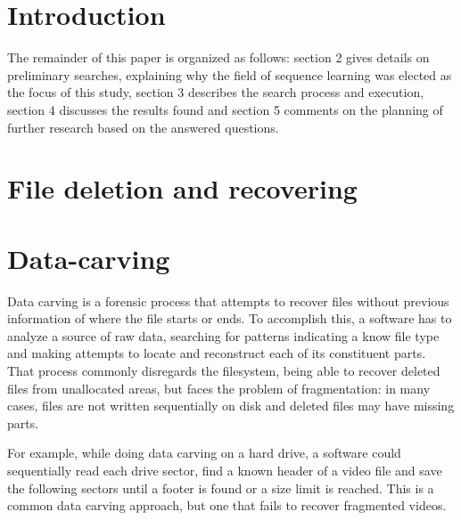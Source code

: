 \chapter{Introduction}
The remainder of this paper is organized as follows:
section 2 gives details on preliminary searches, explaining why the field of sequence learning was elected as the focus of this study, section 3 describes the search process and execution, section 4 discusses the results found and section 5 comments on the planning of further research based on the answered questions.


\chapter{File deletion and recovering}

\chapter{Data-carving}
Data carving is a forensic process that attempts to recover files without previous information of where the file starts or ends.
To accomplish this, a software has to analyze a source of raw data, searching for patterns indicating a know file type and making attempts to locate and reconstruct each of its constituent parts.
That process commonly disregards the filesystem, being able to recover deleted files from unallocated areas, but faces the problem of fragmentation: in many cases, files are not written sequentially on disk and deleted files may have missing parts.

For example, while doing data carving on a hard drive, a software could sequentially read each drive sector, find a known header of a video file and save the following sectors until a footer is found or a size limit is reached. This is a common data carving approach, but one that fails to recover fragmented videos.


